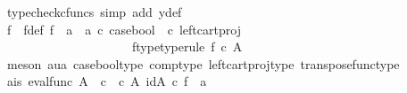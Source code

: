 \begin{isabellebody}
\ {\isacharparenleft}{\kern0pt}typecheck{\isacharunderscore}{\kern0pt}cfuncs{\isacharcomma}{\kern0pt}\ simp\ add{\isacharcolon}{\kern0pt}\ y{\isacharunderscore}{\kern0pt}def{\isacharparenright}{\kern0pt}\ \ \ \ \ \isanewline
\ \ \ \ \isanewline
\ \ \ \ \ \ \isamarkupfalse%
\ f\ \ f{\isacharunderscore}{\kern0pt}def{\isacharcolon}{\kern0pt}\ {\isachardoublequoteopen}f\ {\isacharequal}{\kern0pt}\ {\isacharparenleft}{\kern0pt}{\isacharparenleft}{\kern0pt}a{}\ {\isasymamalg}\ a{}{\isacharparenright}{\kern0pt}\ {\isasymcirc}\isactrlsub c\ case{\isacharunderscore}{\kern0pt}bool\ \ {\isasymcirc}\isactrlsub c\ left{\isacharunderscore}{\kern0pt}cart{\isacharunderscore}{\kern0pt}proj\ {\isasymOmega}\ {\isasymone}{\isacharparenright}{\kern0pt}\isactrlsup {\isasymsharp}{\isachardoublequoteclose}\ \isanewline
\ \ \ \ \ \ \ \ \ \ \ \ \ \ \ \ \ \ \ \ \ f{\isacharunderscore}{\kern0pt}type{\isacharbrackleft}{\kern0pt}type{\isacharunderscore}{\kern0pt}rule{\isacharbrackright}{\kern0pt}{\isacharcolon}{\kern0pt}\ {\isachardoublequoteopen}f\ {\isasymin}\isactrlsub c\ A\isactrlbsup {\isasymOmega}\isactrlesup {\isachardoublequoteclose}\isanewline
\ \ \ \ \ \ \ \ \isamarkupfalse%
\ {\isacharparenleft}{\kern0pt}meson\ aua\ case{\isacharunderscore}{\kern0pt}bool{\isacharunderscore}{\kern0pt}type\ comp{\isacharunderscore}{\kern0pt}type\ left{\isacharunderscore}{\kern0pt}cart{\isacharunderscore}{\kern0pt}proj{\isacharunderscore}{\kern0pt}type\ transpose{\isacharunderscore}{\kern0pt}func{\isacharunderscore}{\kern0pt}type{\isacharparenright}{\kern0pt}\isanewline
\ \ \ \ \ \isamarkupfalse%
\ a{}{\isacharunderscore}{\kern0pt}is{\isacharcolon}{\kern0pt}\ {\isachardoublequoteopen}{\isacharparenleft}{\kern0pt}eval{\isacharunderscore}{\kern0pt}func\ A\ {\isasymOmega}\ {\isasymcirc}\isactrlsub c\ {\isasymlangle}{\isasymt}\ {\isasymcirc}\isactrlsub c\ {\isasymbeta}\isactrlbsub A\isactrlbsup {\isasymOmega}\isactrlesup \isactrlesub {\isacharcomma}{\kern0pt}\ id{\isacharparenleft}{\kern0pt}A\isactrlbsup {\isasymOmega}\isactrlesup {\isacharparenright}{\kern0pt}{\isasymrangle}{\isacharparenright}{\kern0pt}\ {\isasymcirc}\isactrlsub c\ f\ {\isacharequal}{\kern0pt}\ a{}{\isachardoublequoteclose}\isanewline
\ \ \ \ \ \isamarkupfalse%
{\isacharminus}{\kern0pt}\isanewline
\ \ \ \ \ \ \ \isamarkupfalse%

\end{isabellebody}
